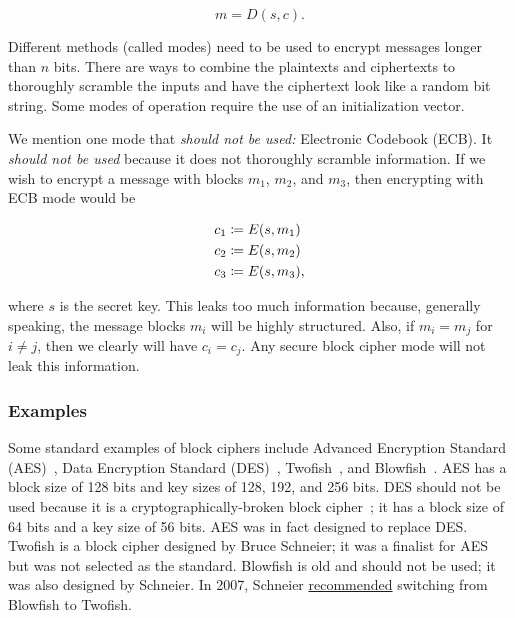 \begin{equation}
    m = D(s,c).
\end{equation}

Different methods (called modes) need to be used to encrypt messages
longer than $n$ bits.
There are ways to combine the plaintexts and ciphertexts
to thoroughly scramble the inputs and have the ciphertext
look like a random bit string.
Some modes of operation require the use of an \gls{initialization vector}.

We mention one mode that \emph{should not be used:}
Electronic Codebook (ECB).
It \emph{should not be used} because it does not thoroughly scramble
information.
If we wish to encrypt a message with blocks $m_{1}$, $m_{2}$, and $m_{3}$,
then encrypting with ECB mode would be

\begin{align}
    c_{1} &\coloneqq{} E(s,m_{1})
        \nonumber\\
    c_{2} &\coloneqq{} E(s,m_{2})
        \nonumber\\
    c_{3} &\coloneqq{} E(s,m_{3}),
\end{align}

\noindent
where $s$ is the secret key.
This leaks too much information because, generally speaking,
the message blocks $m_{i}$ will be highly structured.
Also, if $m_{i} = m_{j}$ for $i\ne j$,
then we clearly will have $c_{i} = c_{j}$.
Any secure \gls{block cipher} mode will not leak this information.

\subsubsection{Examples}

Some standard examples of \glspl{block cipher} include
Advanced Encryption Standard (AES)~\cite{FIPS-197-2001},
Data Encryption Standard (DES)~\cite{FIPS-46-3-1977},
Twofish~\cite{TwofishAlg},
and Blowfish~\cite{BlowfishAlg}.
AES has a block size of 128 bits and key sizes of 128, 192, and 256 bits.
DES should not be used because it is a cryptographically-broken
\gls{block cipher}~\cite{rfc4772};
it has a block size of 64 bits and a key size of 56 bits.
AES was in fact designed to replace DES.
Twofish is a \gls{block cipher} designed by Bruce Schneier;
it was a finalist for AES but was not selected as the standard.
Blowfish is old and should not be used;
it was also designed by Schneier.
In 2007, Schneier
\href{https://www.schneier.com/news/archives/2007/12/bruce_almighty_schne.html}{recommended}
switching from Blowfish to Twofish.


